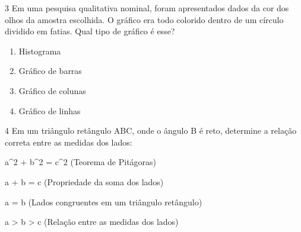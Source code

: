 




\num{3} Em uma pesquisa qualitativa nominal, foram apresentados dados da cor
dos olhos da amostra escolhida. O gráfico era todo colorido dentro de um
círculo dividido em fatias. Qual tipo de gráfico é esse?

\begin{enumerate}
\def\labelenumi{\alph{enumi}.}
\item
  Histograma
\item
  Gráfico de barras
\item
  Gráfico de colunas
\item
  Gráfico de linhas~
\end{enumerate}







\num{4} Em um triângulo retângulo ABC, onde o ângulo B é reto, determine a
relação correta entre as medidas dos lados:
\item a^2 + b^2 = c^2 (Teorema de Pitágoras)
\item a + b = c (Propriedade da soma dos lados)
\item a = b (Lados congruentes em um triângulo retângulo)
\item a \textgreater{} b \textgreater{} c (Relação entre as medidas dos
lados)

